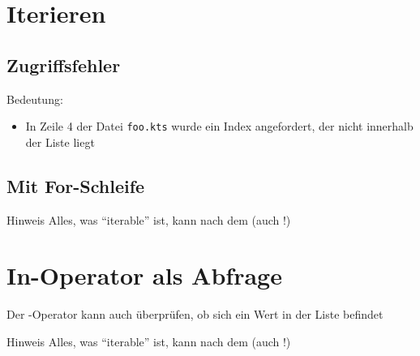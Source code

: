 \section{Iterieren}\label{sec:iterieren}
\subsection{Zugriffsfehler}\label{subsec:zugriffsfehler}
\begin{frame}[fragile]
    \slidehead
    \pause
    Bedeutung:
    \begin{itemize}
        \item In Zeile 4 der Datei \texttt{foo.kts} wurde ein Index angefordert, der nicht innerhalb der Liste liegt
    \end{itemize}
\end{frame}

\subsection{Mit For-Schleife}
\begin{frame}
    \slidehead
    \pause
    \begin{block}{Hinweis}
        Alles, was \enquote{iterable} ist, kann nach dem  (auch !)
    \end{block}
\end{frame}

\livecoding

\section{In-Operator als Abfrage}\label{sec:in-operator-als-abfrage}

\begin{frame}
    \slidehead
    Der -Operator kann auch überprüfen, ob sich ein Wert in der Liste befindet
    \pause
    \pause
    \begin{block}{Hinweis}
        Alles, was \enquote{iterable} ist, kann nach dem  (auch !)
    \end{block}
    \pause
\end{frame}

